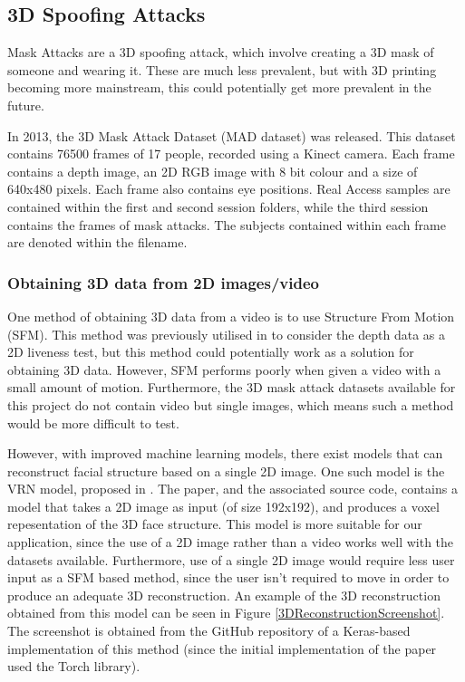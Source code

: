 \documentclass[11pt,a4paper]{article}
\begin{document}
    \subsection{3D Spoofing Attacks}
        Mask Attacks are a 3D spoofing attack, which involve creating a 3D mask of someone and wearing it. \cite{FaceSpoofingAttacksStudy} These are much less prevalent, but with 3D printing becoming more mainstream, this
        could potentially get more prevalent in the future.

        In 2013, the 3D Mask Attack Dataset (MAD dataset) was released. This dataset contains 76500 frames of 17 people, recorded using a Kinect camera.
        Each frame contains a depth image, an 2D RGB image with 8 bit colour and a size of 640x480 pixels. Each frame also contains eye positions.
        Real Access samples are contained within the first and second session folders, while the third session contains the frames of mask attacks. The subjects contained
        within each frame are denoted within the filename.
        
        \cite{3DMadDataset}

        \subsubsection{Obtaining 3D data from 2D images/video}
            One method of obtaining 3D data from a video is to use Structure From Motion (SFM). This method was previously utilised in \cite{SFMClassifier} to consider the depth data as a 2D liveness test,
            but this method could potentially work as a solution for obtaining 3D data. However, SFM performs poorly when given a video with a small amount of motion. Furthermore, the 3D mask attack datasets
            available for this project do not contain video but single images, which means such a method would be more difficult to test.

            However, with improved machine learning models, there exist models that can reconstruct facial structure based on a single 2D image. One such model is the VRN model, proposed in \cite{3DReconstructionMethod}.
            The paper, and the associated source code, contains a model that takes a 2D image as input (of size 192x192), and produces a voxel repesentation of the 3D face structure. This model is more suitable for our
            application, since the use of a 2D image rather than a video works well with the datasets available. Furthermore, use of a single 2D image would require less user input as a SFM based method, since the user isn't required
            to move in order to produce an adequate 3D reconstruction. An example of the 3D reconstruction obtained from this model can be seen in Figure \ref{3DReconstructionScreenshot}. The screenshot is obtained from the GitHub repository
            of a Keras-based implementation of this method (since the initial implementation of the paper used the Torch library).
\end{document}
